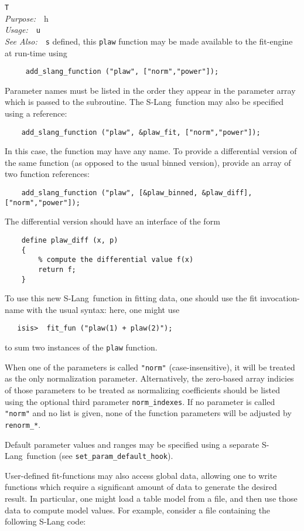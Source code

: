 \documentclass{book}
\makeatletter
\newif\ifpdf
\newcommand{\slang}{{\sc S-Lang}}
\newenvironment{isisfunction}[4]%
{\index{{#1}@{\tt #1}}%
  \ifpdf
  \else
     \addcontentsline{toc}{subsection}{{#1} -- {#2}}
  \fi
  \vbox{
          \vspace*{\baselineskip}
          {\LARGE\tt #1}\vspace*{\baselineskip}\\
          {{\it Purpose:}~~{#2}}\\
          {{\it Usage:}~~{\tt #3}}\\
          {{\it See Also:}~~{\tt #4}}
       }
}%
{ }
\makeatother
\begin{document}
{\begin{isisfunction}
Thus defined, this {\tt plaw} function may be made available to
the fit-engine at run-time using
\begin{verbatim}
     add_slang_function ("plaw", ["norm","power"]);
\end{verbatim}
Parameter names must be listed in the order they appear in the parameter
array which is passed to the subroutine.  The \slang\ function
may also be specified using a reference:
\begin{verbatim}
    add_slang_function ("plaw", &plaw_fit, ["norm","power"]);
\end{verbatim}
In this case, the function may have any name.  To provide
a differential version of the same function (as opposed to
the usual binned version), provide an array of two function
references:
\begin{verbatim}
    add_slang_function ("plaw", [&plaw_binned, &plaw_diff], ["norm","power"]);
\end{verbatim}
The differential version should have an interface of the form
\begin{verbatim}
    define plaw_diff (x, p)
    {
        % compute the differential value f(x)
        return f;
    }
\end{verbatim}

To use this new \slang\ function in fitting data, one should use
the fit invocation-name with the usual syntax: here, one might
use
\begin{verbatim}
   isis>  fit_fun ("plaw(1) + plaw(2)");
\end{verbatim}
to sum two instances of the {\tt plaw} function.

When one of the parameters is called {\tt "norm"}
(case-insensitive), it will be treated as the only
normalization parameter.  Alternatively, the zero-based array
indicies of those parameters to be treated as normalizing
coefficients should be listed using the optional third
parameter {\tt norm\_indexes}. If no parameter is called {\tt
"norm"} and no list is given, none of the function parameters
will be adjusted by {\tt renorm\_*}.

Default parameter values and ranges may be specified using a
separate \slang\ function (see \verb|set_param_default_hook|).

User-defined fit-functions may also access global data, allowing
one to write functions which require a significant amount of data
to generate the desired result.  In particular, one might load a
table model from a file, and then use those data to compute model
values. For example, consider a file containing the following
S-Lang code:


\end{isisfunction}}
\end{document}
